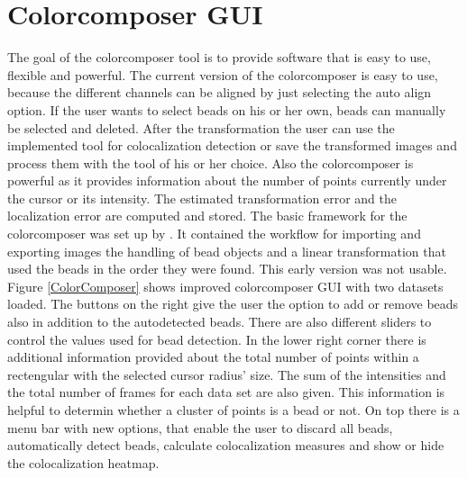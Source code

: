 \section{Colorcomposer GUI}
The goal of the colorcomposer tool is to provide software that is easy to use, flexible and powerful. The current version of the colorcomposer is easy to use, because the different channels can be aligned by just selecting the auto align option.\newline
If the user wants to select beads on his or her own, beads can manually be selected and deleted. After the transformation the user can use the implemented tool for colocalization detection or save the transformed images and process them with the tool of his or her choice.\newline
Also the colorcomposer is powerful as it provides information about the number of points currently under the cursor or its intensity. The estimated transformation error and the localization error are computed and stored.\newline
The basic framework for the colorcomposer was set up by \cite{MAJoachim}. It contained the workflow for importing and exporting images the handling of bead objects and a linear transformation that used the beads in the order they were found. This early version was not usable.\newline
Figure \ref{ColorComposer} shows improved colorcomposer GUI with two datasets loaded. The buttons on the right give the user the option to add or remove beads also in addition to the autodetected beads. There are also different sliders to control the values used for bead detection. In the lower right corner there is additional information provided about the total number of points within a rectengular with the selected cursor radius' size. The sum of the intensities and the total number of frames for each data set are also given. This information is helpful to determin whether a cluster of points is a bead or not.\newline
On top there is a menu bar with new options, that enable the user to discard all beads, automatically detect beads, calculate colocalization measures and show or hide the colocalization heatmap.
